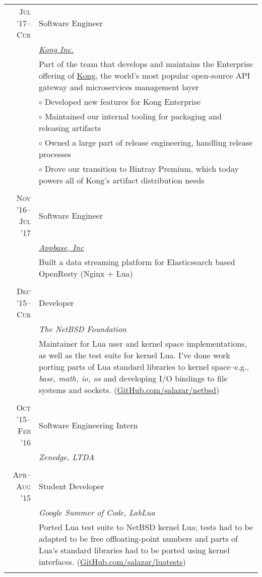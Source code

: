 \documentclass[a4paper,10pt]{article}
\begin{document}
\begin{longtable}{r|p{11cm}}

  \textsc{Jul '17--Cur} & Software Engineer\\
  &\emph{\href{https://konghq.com}{Kong Inc.}}\\
  &\footnotesize{Part of the team that develops and maintains the Enterprise
  offering of \href{https://konghq.com/}{Kong}, the world's most popular
  open-source API gateway and microservices management layer} \\
  &\footnotesize{$\circ$ Developed new features for Kong Enterprise} \\
  &\footnotesize{$\circ$ Maintained our internal tooling for packaging and releasing artifacts} \\
  &\footnotesize{$\circ$ Owned a large part of release engineering, handling release processes} \\
  &\footnotesize{$\circ$ Drove our transition to Bintray Premium, which today powers all of Kong's artifact distribution needs}
  \\\multicolumn{2}{c}{} \\

  \textsc{Nov '16--Jul '17} & Software Engineer\\
  &\emph{\href{https://appbase.io}{Appbase, Inc}}\\
  &\footnotesize{Built a data streaming platform for Elasticsearch based OpenResty (Nginx + Lua)}
  \\\multicolumn{2}{c}{} \\

  \textsc{Dec '15--Cur} & Developer\\ &\emph{The NetBSD
  Foundation}\\ &\footnotesize{Maintainer for Lua user and kernel
  space implementations, as well as the test suite for kernel Lua.
  I've done work porting parts of Lua standard
  libraries to kernel space--e.g., \emph{base, math, io, os} and
  developing I/O bindings to file systems and sockets.
  (\href{https://GitHub.com/salazar/netbsd}{GitHub.com/salazar/netbsd}})
  \\\multicolumn{2}{c}{} \\

  \textsc{Oct '15--Feb '16} & Software Engineering Intern \\ &\emph{Zenedge,
  LTDA}\\ \multicolumn{2}{c}{} \\

  \textsc{Apr--Aug '15} & Student Developer \\ &\emph{Google Summer of
  Code, LabLua}\\ &\footnotesize{Ported Lua test suite to NetBSD
  kernel Lua; tests
  had to be adapted to be free offloating-point numbers and parts of Lua's standard libraries had to be
  ported using kernel interfaces.
  (\href{https://GitHub.com/salazar/luatests}{GitHub.com/salazar/luatests}})
  \\\multicolumn{2}{c}{} \\


\end{longtable}
\end{document}
